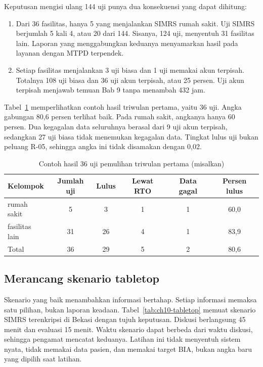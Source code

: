 Keputusan mengisi ulang 144 uji punya dua konsekuensi yang dapat dihitung:
\begin{enumerate}
  \item Dari 36 fasilitas, hanya 5 yang menjalankan SIMRS rumah sakit. Uji SIMRS berjumlah 5 kali
  4, atau 20 dari 144. Sisanya, 124 uji, menyentuh 31 fasilitas lain. Laporan yang menggabungkan
  keduanya menyamarkan hasil pada layanan dengan MTPD terpendek.
  \item Setiap fasilitas menjalankan 3 uji biasa dan 1 uji memakai akun terpisah. Totalnya 108 uji
  biasa dan 36 uji akun terpisah, atau 25 persen. Uji akun terpisah menjawab temuan Bab 9 tanpa
  menambah 432 jam.
\end{enumerate}

Tabel~\ref{tab:ch10-uji-hasil} memperlihatkan contoh hasil triwulan pertama, yaitu 36 uji. Angka
gabungan 80,6 persen terlihat baik. Pada rumah sakit, angkanya hanya 60 persen. Dua kegagalan data
seluruhnya berasal dari 9 uji akun terpisah, sedangkan 27 uji biasa tidak menemukan kegagalan data.
Tingkat lulus uji bukan peluang R-05, sehingga angka ini tidak disamakan dengan 0,02.

\begin{table}[!htb]
  \centering\small
  \caption{Contoh hasil 36 uji pemulihan triwulan pertama (misalkan)}\label{tab:ch10-uji-hasil}
  \begin{tabularx}{\textwidth}{|>{\raggedright\arraybackslash}X|c|c|c|c|c|}
    \hline
    \textbf{Kelompok} & \textbf{Jumlah uji} & \textbf{Lulus} & \textbf{Lewat RTO} & \textbf{Data
    gagal} & \textbf{Persen lulus} \\ \hline
    5 rumah sakit & 5 & 3 & 1 & 1 & 60,0 \\ \hline
    31 fasilitas lain & 31 & 26 & 4 & 1 & 83,9 \\ \hline
    Total & 36 & 29 & 5 & 2 & 80,6 \\ \hline
  \end{tabularx}
\end{table}

\subsection*{Merancang skenario tabletop}

Skenario yang baik menambahkan informasi bertahap. Setiap informasi memaksa satu pilihan, bukan
laporan keadaan. Tabel~\ref{tab:ch10-tabletop} memuat skenario SIMRS terenkripsi di Bekasi dengan
tujuh keputusan. Diskusi berlangsung 45 menit dan evaluasi 15 menit. Waktu skenario dapat berbeda
dari waktu diskusi, sehingga pengamat mencatat keduanya. Latihan ini tidak menyentuh sistem nyata,
tidak memakai data pasien, dan memakai target BIA, bukan angka baru yang dipilih saat latihan.

